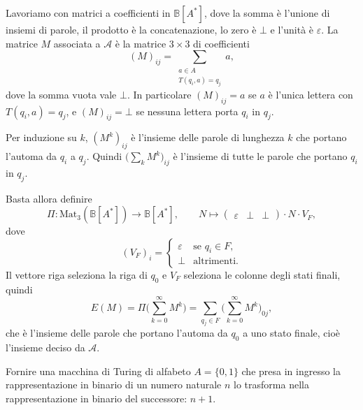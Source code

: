 \begin{sol}
Lavoriamo con matrici a coefficienti in $\mathbb B[A^*]$, dove la somma è l'unione di insiemi di parole, il prodotto è la concatenazione, lo zero è $\bot$ e l'unità è $\varepsilon$. La matrice $M$ associata a $\mathcal A$ è la matrice $3\times3$ di coefficienti
\[
(M)_{ij}=\sum_{\substack{a\in A\\ T(q_i,a)=q_j}}a ,
\]
dove la somma vuota vale $\bot$. In particolare $(M)_{ij}=a$ se $a$ è l'unica lettera con $T(q_i,a)=q_j$, e $(M)_{ij}=\bot$ se nessuna lettera porta $q_i$ in $q_j$.

Per induzione su $k$, $(M^k)_{ij}$ è l'insieme delle parole di lunghezza $k$ che portano l'automa da $q_i$ a $q_j$. Quindi $\big(\sum_{k}M^k\big)_{ij}$ è l'insieme di tutte le parole che portano $q_i$ in $q_j$.

Basta allora definire
\[
\Pi\colon \mathrm{Mat}_3(\mathbb B[A^*])\to\mathbb B[A^*],\qquad N\longmapsto \begin{pmatrix}\varepsilon&\bot&\bot\end{pmatrix}\cdot N\cdot V_F ,
\]
dove
\[
(V_F)_i=\begin{cases}\varepsilon & \text{se } q_i\in F,\\ \bot & \text{altrimenti.}\end{cases}
\]
Il vettore riga seleziona la riga di $q_0$ e $V_F$ seleziona le colonne degli stati finali, quindi
\[
E(M)=\Pi\Big(\sum_{k=0}^{\infty}M^k\Big)=\sum_{q_j\in F}\Big(\sum_{k=0}^{\infty}M^k\Big)_{0j},
\]
che è l'insieme delle parole che portano l'automa da $q_0$ a uno stato finale, cioè l'insieme deciso da $\mathcal A$.
\end{sol}

\newpage

\begin{ex}
Fornire una macchina di Turing di alfabeto $A=\{0,1\}$ che presa in ingresso la rappresentazione in binario di un numero naturale $n$ lo trasforma nella rappresentazione in binario del successore: $n+1$.
\end{ex}

